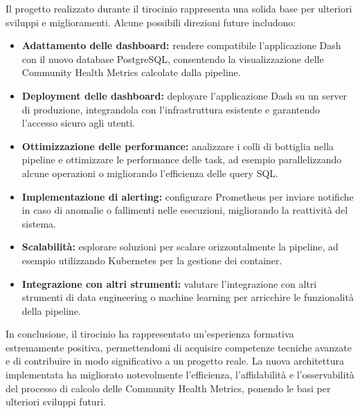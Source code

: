Il progetto realizzato durante il tirocinio rappresenta una solida base per ulteriori sviluppi e miglioramenti. Alcune possibili direzioni future includono:
\begin{itemize}
    \item \textbf{Adattamento delle dashboard:} rendere compatibile l’applicazione Dash con il nuovo database PostgreSQL, consentendo la visualizzazione delle Community Health Metrics calcolate dalla pipeline.
    \item \textbf{Deployment delle dashboard:} deployare l’applicazione Dash su un server di produzione, integrandola con l'infrastruttura esistente e garantendo l’accesso sicuro agli utenti.
    \item \textbf{Ottimizzazione delle performance:} analizzare i colli di bottiglia nella pipeline e ottimizzare le performance delle task, ad esempio parallelizzando alcune operazioni o migliorando l’efficienza delle query SQL.
    \item \textbf{Implementazione di alerting:} configurare Prometheus per inviare notifiche in caso di anomalie o fallimenti nelle esecuzioni, migliorando la reattività del sistema.
    \item \textbf{Scalabilità:} esplorare soluzioni per scalare orizzontalmente la pipeline, ad esempio utilizzando Kubernetes per la gestione dei container.
    \item \textbf{Integrazione con altri strumenti:} valutare l’integrazione con altri strumenti di data engineering o machine learning per arricchire le funzionalità della pipeline.
\end{itemize}

In conclusione, il tirocinio ha rappresentato un’esperienza formativa estremamente positiva, permettendomi di acquisire competenze tecniche avanzate e di contribuire in modo significativo a un progetto reale. La nuova architettura implementata ha migliorato notevolmente l’efficienza, l’affidabilità e l’osservabilità del processo di calcolo delle Community Health Metrics, ponendo le basi per ulteriori sviluppi futuri.